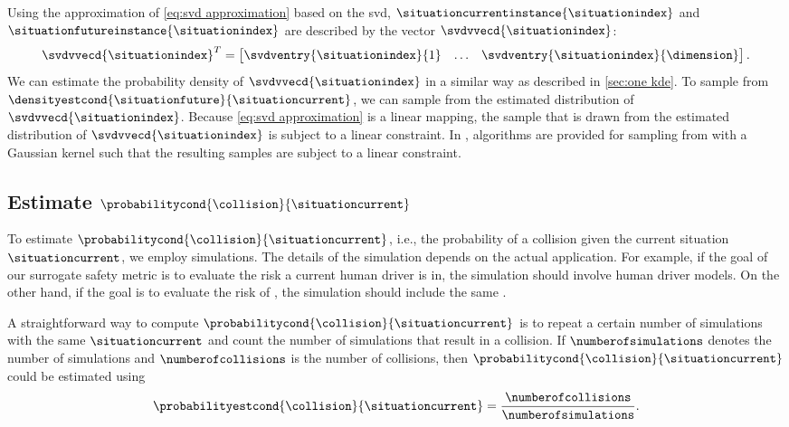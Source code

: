 Using the approximation of \cref{eq:svd approximation} based on the \ac{svd}, $\situationcurrentinstance{\situationindex}$ and $\situationfutureinstance{\situationindex}$ are described by the vector $\svdvvecd{\situationindex}$:
\begin{equation}
	\label{eq:reduced parameter vector}
	\svdvvecd{\situationindex}^T = \begin{bmatrix}
		\svdventry{\situationindex}{1} & \ldots & \svdventry{\situationindex}{\dimension}
	\end{bmatrix}.
\end{equation}
We can estimate the probability density of $\svdvvecd{\situationindex}$ in a similar way as described in \cref{sec:one kde}.
To sample from $\densityestcond{\situationfuture}{\situationcurrent}$, we can sample from the estimated distribution of $\svdvvecd{\situationindex}$.
Because \cref{eq:svd approximation} is a linear mapping, the sample that is drawn from the estimated distribution of $\svdvvecd{\situationindex}$ is subject to a linear constraint.
In \autocite{degelder2021conditional}, algorithms are provided for sampling from  with a Gaussian kernel such that the resulting samples are subject to a linear constraint.



\subsection{Estimate $\probabilitycond{\collision}{\situationcurrent}$}
\label{sec:estimate collision}

To estimate $\probabilitycond{\collision}{\situationcurrent}$, i.e., the probability of a collision given the current situation $\situationcurrent$, we employ simulations. 
The details of the simulation depends on the actual application. 
For example, if the goal of our surrogate safety metric is to evaluate the risk a current human driver is in, the simulation should involve human driver models. 
On the other hand, if the goal is to evaluate the risk of , the simulation should include the same .

A straightforward way to compute $\probabilitycond{\collision}{\situationcurrent}$ is to repeat a certain number of simulations with the same $\situationcurrent$ and count the number of simulations that result in a collision.
If $\numberofsimulations$ denotes the number of simulations and $\numberofcollisions$ is the number of collisions, then $\probabilitycond{\collision}{\situationcurrent}$ could be estimated using
\begin{equation}
	\label{eq:binomial estimation}
	\probabilityestcond{\collision}{\situationcurrent}
	= \frac{\numberofcollisions}{\numberofsimulations}.
\end{equation}


